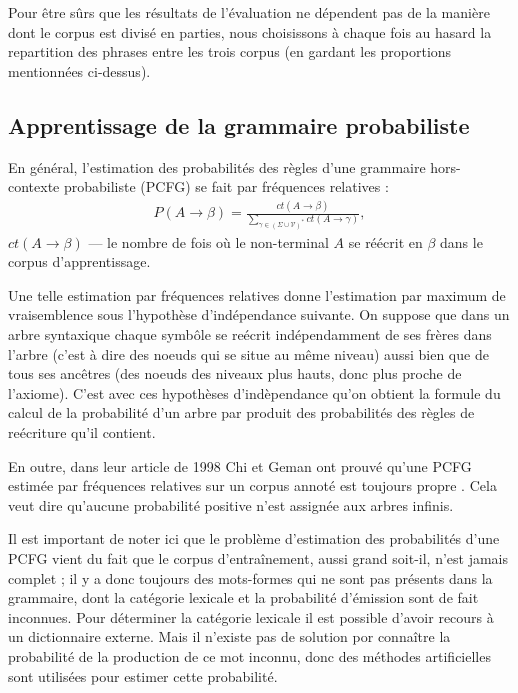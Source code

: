 \documentclass[12pt]{article}
\begin{document}
Pour \^etre s\^urs que les r\'esultats de l'\'evaluation ne d\'ependent pas de la mani\`ere
dont le corpus est divis\'e en parties, nous choisissons \`a chaque fois au hasard
la repartition des phrases entre les trois corpus (en gardant les proportions mentionn\'ees
ci-dessus).


\subsection{Apprentissage de la grammaire probabiliste}

En g\'en\'eral, l'estimation des probabilit\'es des r\`egles d'une grammaire
hors-contexte probabiliste (PCFG) se fait par fr\'equences relatives :
\begin{eqnarray}
P(A \rightarrow \beta) = \frac{ct(A \rightarrow \beta)}{\sum\limits_{\gamma \in (\Sigma \cup \mathcal{V})^*}{ct(A \rightarrow \gamma)}},
\end{eqnarray}
$ct(A \rightarrow \beta)$ --- le nombre de fois o\`u le non-terminal $A$ se
r\'e\'ecrit en $\beta$ dans le corpus d'apprentissage.

Une telle estimation par fr\'equences relatives donne l'estimation par maximum de vraisemblence
sous l'hypoth\`ese d'ind\'ependance suivante. On suppose que dans un arbre syntaxique chaque
symb\^ole se re\'ecrit ind\'ependamment de ses fr\`eres dans l'arbre (c'est \`a dire des noeuds qui se situe
au m\^eme niveau) aussi bien que de tous ses anc\^etres (des noeuds des niveaux plus hauts, donc plus proche de l'axiome). 
C'est avec ces hypoth\`eses d'ind\`ependance qu'on obtient la formule du calcul de la probabilit\'e
d'un arbre par produit des probabilit\'es des r\`egles de re\'ecriture qu'il contient.

En outre, dans leur article de 1998 Chi et Geman ont prouv\'e qu'une PCFG estim\'ee par
fr\'equences relatives sur un corpus annot\'e est toujours propre
\cite{proper_PCFG_estimation}. Cela veut dire qu'aucune probabilit\'e positive
n'est assign\'ee aux arbres infinis.

Il est important de noter ici que le probl\`eme d'estimation des probabilit\'es
d'une PCFG vient du fait que le corpus d'entra\^inement, aussi grand soit-il,
n'est jamais complet ; il y a donc toujours des mots-formes qui ne sont pas
pr\'esents dans la grammaire, dont la cat\'egorie lexicale et la
probabilit\'e d'\'emission sont de fait inconnues. Pour d\'eterminer la cat\'egorie
lexicale il est possible d'avoir recours \`a un dictionnaire externe. Mais il
n'existe pas de solution por conna\^itre la probabilit\'e de la production de ce
mot inconnu, donc des m\'ethodes artificielles sont utilis\'ees pour estimer
cette probabilit\'e.
\end{document}
